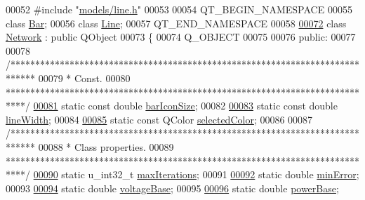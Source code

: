 \begin{DoxyCode}
00052 \textcolor{preprocessor}{#include "\hyperlink{line_8h}{models/line.h}"}
00053 
00054 QT\_BEGIN\_NAMESPACE
00055 \textcolor{keyword}{class }\hyperlink{class_bar}{Bar};
00056 \textcolor{keyword}{class }\hyperlink{class_line}{Line};
00057 QT\_END\_NAMESPACE
00058 
\hypertarget{network_8h_source_l00072}{}\hyperlink{class_network}{00072} \textcolor{keyword}{class }\hyperlink{class_network}{Network} : \textcolor{keyword}{public} QObject
00073 \{
00074   Q\_OBJECT
00075 
00076 \textcolor{keyword}{public}:
00077 
00078   \textcolor{comment}{/*****************************************************************************}
00079 \textcolor{comment}{   * Const.}
00080 \textcolor{comment}{   ****************************************************************************/}
\hypertarget{network_8h_source_l00081}{}\hyperlink{group___graphics_gaa334bbc93b3fde219840e95e23198b53}{00081}   \textcolor{keyword}{static} \textcolor{keyword}{const} \textcolor{keywordtype}{double} \hyperlink{group___graphics_gaa334bbc93b3fde219840e95e23198b53}{barIconSize};
00082 
\hypertarget{network_8h_source_l00083}{}\hyperlink{group___graphics_ga3f810634c9908d62d33a1ab09a76c147}{00083}   \textcolor{keyword}{static} \textcolor{keyword}{const} \textcolor{keywordtype}{double} \hyperlink{group___graphics_ga3f810634c9908d62d33a1ab09a76c147}{lineWidth};
00084 
\hypertarget{network_8h_source_l00085}{}\hyperlink{group___graphics_gaa9e21b8e2a24b0495e776a51e1aeed94}{00085}   \textcolor{keyword}{static} \textcolor{keyword}{const} QColor \hyperlink{group___graphics_gaa9e21b8e2a24b0495e776a51e1aeed94}{selectedColor};
00086 
00087   \textcolor{comment}{/*****************************************************************************}
00088 \textcolor{comment}{   * Class properties.}
00089 \textcolor{comment}{   ****************************************************************************/}
\hypertarget{network_8h_source_l00090}{}\hyperlink{class_network_a1a818069626eb82d58e3974a5b3492a6}{00090}   \textcolor{keyword}{static} u\_int32\_t \hyperlink{class_network_a1a818069626eb82d58e3974a5b3492a6}{maxIterations};
00091 
\hypertarget{network_8h_source_l00092}{}\hyperlink{class_network_abcdc973129d3dda7572b7a1c388da1b5}{00092}   \textcolor{keyword}{static} \textcolor{keywordtype}{double} \hyperlink{class_network_abcdc973129d3dda7572b7a1c388da1b5}{minError};
00093 
\hypertarget{network_8h_source_l00094}{}\hyperlink{class_network_a7c1e79d9ac69df9a69f24eaf092fd5e5}{00094}   \textcolor{keyword}{static} \textcolor{keywordtype}{double} \hyperlink{class_network_a7c1e79d9ac69df9a69f24eaf092fd5e5}{voltageBase};
00095 
\hypertarget{network_8h_source_l00096}{}\hyperlink{class_network_a74bb7aa495d422f1f092acdf958df989}{00096}   \textcolor{keyword}{static} \textcolor{keywordtype}{double} \hyperlink{class_network_a74bb7aa495d422f1f092acdf958df989}{powerBase};

\end{DoxyCode}
